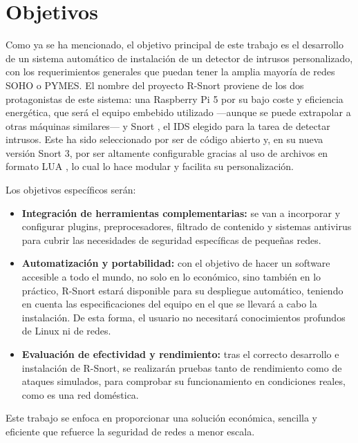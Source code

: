 \documentclass[12pt,a4paper]{report}
\begin{document}
\chapter{Objetivos}
Como ya se ha mencionado, el objetivo principal de este trabajo es el desarrollo de un sistema automático de instalación de un detector de intrusos personalizado, con los requerimientos generales que puedan tener la amplia mayoría de redes SOHO o PYMES. El nombre del proyecto R-Snort proviene de los dos protagonistas de este sistema: una Raspberry Pi 5 \cite{rodriguez2018cluster} por su bajo coste y eficiencia energética, que será el equipo embebido utilizado —aunque se puede extrapolar a otras máquinas similares— y Snort \cite{roesch1999snort}, el IDS elegido para la tarea de detectar intrusos. Este ha sido seleccionado por ser de código abierto y, en su nueva versión Snort 3, por ser altamente configurable gracias al uso de archivos en formato LUA \cite{snort3_official}, lo cual lo hace modular y facilita su personalización.\newline

Los objetivos específicos serán:

\begin{itemize}
    \item \textbf{Integración de herramientas complementarias:} se van a incorporar y configurar plugins, preprocesadores, filtrado de contenido y sistemas antivirus para cubrir las necesidades de seguridad específicas de pequeñas redes.
    
    \item \textbf{Automatización y portabilidad:} con el objetivo de hacer un software accesible a todo el mundo, no solo en lo económico, sino también en lo práctico, R-Snort estará disponible para su despliegue automático, teniendo en cuenta las especificaciones del equipo en el que se llevará a cabo la instalación. De esta forma, el usuario no necesitará conocimientos profundos de Linux ni de redes.
    
    \item \textbf{Evaluación de efectividad y rendimiento:} tras el correcto desarrollo e instalación de R-Snort, se realizarán pruebas tanto de rendimiento como de ataques simulados, para comprobar su funcionamiento en condiciones reales, como es una red doméstica.
    
\end{itemize}

Este trabajo se enfoca en proporcionar una solución económica, sencilla y eficiente que refuerce la seguridad de redes a menor escala.
\end{document}
